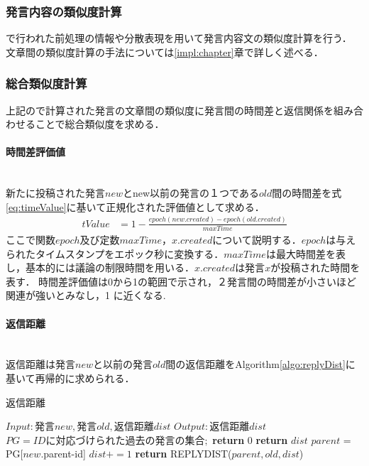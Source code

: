\subsubsection*{ 発言内容の類似度計算}
\label{model:simRemark:2}
で行われた前処理の情報や分散表現を用いて発言内容文の類似度計算を行う．
文章間の類似度計算の手法については\ref{impl:chapter}章で詳しく述べる．
\subsubsection*{ 総合類似度計算}
上記ので計算された発言の文章間の類似度に発言間の時間差と返信関係を組み合わせることで総合類似度を求める．
\paragraph{時間差評価値}\ \\
新たに投稿された発言$new$とnew以前の発言の１つである$old$間の時間差を式\ref{eq:timeValue}に基いて正規化された評価値として求める．
\begin{equation}
\begin{aligned}
\label{eq:timeValue}
tValue & = 1 - \frac{ epoch(new.created) - epoch(old.created) }{ maxTime }
\end{aligned}
\end{equation}
ここで関数$epoch$及び定数$maxTime$，$x.created$について説明する．$epoch$は与えられたタイムスタンプをエポック秒に変換する．$maxTime$は最大時間差を表し，基本的には議論の制限時間を用いる．$x.created$は発言$x$が投稿された時間を表す．
時間差評価値は0から1の範囲で示され，２発言間の時間差が小さいほど関連が強いとみなし，1 に近くなる.

\paragraph{返信距離}\ \\
返信距離は発言$new$と以前の発言$old$間の返信距離をAlgorithm\ref{algo:replyDist}に基いて再帰的に求められる．

\begin{algorithm}
\caption{返信距離} \label{algo:replyDist}
\begin{algorithmic}[1]
\State $Input:  発言new,発言old,返信距離dist$ 
\State $Output: 返信距離dist$
\State $PG = IDに対応づけられた過去の発言の集合;$%
	\label{replyDist:if1-b}
		\State \textbf{return} 0\label{replyDist:if1-e}
	\label{replyDist:if2-b}
		\State \textbf{return} $dist$\label{replyDist:if2-e}
	 \Else\label{replyDist:if3-b}
	 	\State $parent$ = PG[$new$.parent-id]
		\State $dist+=1$
		\State \textbf{return} REPLYDIST($parent,old,dist$)\label{replyDist:if3-e}
	\EndIf
\EndProcedure
\end{algorithmic}
\end{algorithm}

